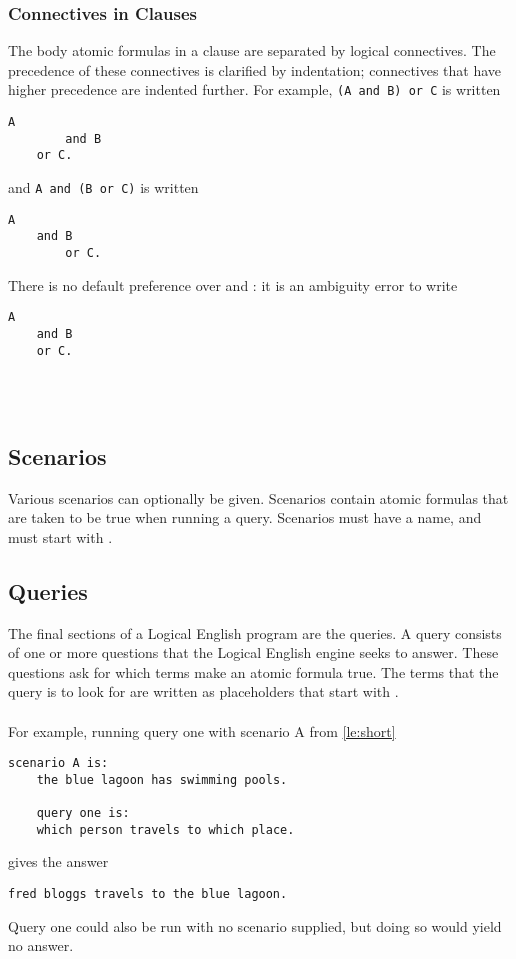 \documentclass[../main.tex]{subfiles}
\begin{document}
\subsubsection{Connectives in Clauses}
The body atomic formulas in a clause are separated by logical connectives. The precedence of these connectives is clarified by indentation; connectives that have higher precedence are indented further. For example, \texttt{(A and B) or C} is written
\newpage
\begin{lstlisting}[language={LE}]
    A
        and B
    or C.
\end{lstlisting}
and \texttt{A and (B or C)} is written
\begin{lstlisting}[language={LE}]
    A
    and B
        or C.
\end{lstlisting}
There is no default preference over  and : it is an ambiguity error to write
\begin{lstlisting}[language={LE}]
    A 
    and B
    or C.
\end{lstlisting}
\\
\\

\subsection{Scenarios}
Various scenarios can optionally be given. Scenarios contain atomic formulas that are taken to be true when running a query. Scenarios must have a name, and must start with 
. 

\subsection{Queries}
The final sections of a Logical English program are the queries. A query consists of one or more questions that the Logical English engine seeks to answer. These questions ask for which terms make an atomic formula true. The terms that the query is to look for are written as placeholders that start with . 
\\
\\
For example, running query one with scenario A from \ref{le:short}
\begin{lstlisting}[language={LE}]
    scenario A is:
    the blue lagoon has swimming pools.

    query one is:
    which person travels to which place.
\end{lstlisting}
gives the answer
\begin{lstlisting}[language={LE}]
    fred bloggs travels to the blue lagoon.
\end{lstlisting}
Query one could also be run with no scenario supplied, but doing so would yield no answer.
\end{document}
